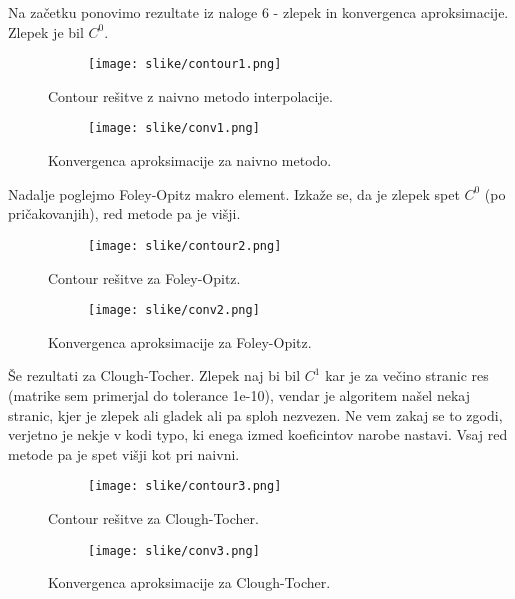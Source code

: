\documentclass{article}
\begin{document}
Na začetku ponovimo rezultate iz naloge 6 - zlepek in konvergenca aproksimacije. Zlepek je bil $C^0$.
\begin{figure}[H]
\centering
\begin{subfigure}{.9\textwidth}
\texttt{[image: slike/contour1.png]}
\end{subfigure}
\caption*{Contour rešitve z naivno metodo interpolacije.}
\end{figure}

\begin{figure}[H]
\centering
\begin{subfigure}{.9\textwidth}
\texttt{[image: slike/conv1.png]}
\end{subfigure}
\caption*{Konvergenca aproksimacije za naivno metodo.}
\end{figure}


Nadalje poglejmo Foley-Opitz makro element. Izkaže se, da je zlepek spet $C^0$ (po pričakovanjih), red metode pa je višji.

\begin{figure}[H]
\centering
\begin{subfigure}{.9\textwidth}
\texttt{[image: slike/contour2.png]}
\end{subfigure}
\caption*{Contour rešitve za Foley-Opitz.}
\end{figure}

\begin{figure}[H]
\centering
\begin{subfigure}{.9\textwidth}
\texttt{[image: slike/conv2.png]}
\end{subfigure}
\caption*{Konvergenca aproksimacije za Foley-Opitz.}
\end{figure}


Še rezultati za Clough-Tocher. Zlepek naj bi bil $C^1$ kar je za večino stranic res (matrike sem primerjal do tolerance 1e-10), vendar je algoritem našel nekaj stranic, kjer je zlepek ali gladek ali pa sploh nezvezen. Ne vem zakaj se to zgodi, verjetno je nekje v kodi typo, ki enega izmed koeficintov narobe nastavi. Vsaj red metode pa je spet višji kot pri naivni.

\begin{figure}[H]
\centering
\begin{subfigure}{.9\textwidth}
\texttt{[image: slike/contour3.png]}
\end{subfigure}
\caption*{Contour rešitve za Clough-Tocher.}
\end{figure}

\begin{figure}[H]
\centering
\begin{subfigure}{.9\textwidth}
\texttt{[image: slike/conv3.png]}
\end{subfigure}
\caption*{Konvergenca aproksimacije za Clough-Tocher.}
\end{figure}
\end{document}
